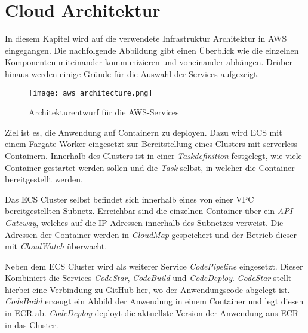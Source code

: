 \section{Cloud Architektur}
In diesem Kapitel wird auf die verwendete Infrastruktur Architektur in \ac{AWS} eingegangen. Die nachfolgende Abbildung gibt einen Überblick wie die einzelnen Komponenten miteinander kommunizieren und voneinander abhängen. Drüber hinaus werden einige Gründe für die Auswahl der Services aufgezeigt.

\begin{figure}[H]
    \centering
    \texttt{[image: aws\_architecture.png]}
    \caption{Architekturentwurf für die AWS-Services}
    \label{fig:CloudArchitektur}
\end{figure}

Ziel ist es, die Anwendung auf Containern zu deployen. Dazu wird \ac{ECS} mit einem \gls{Fargate}-Worker eingesetzt zur Bereitstellung eines Clusters mit serverless Containern. Innerhalb des Clusters ist in einer \textit{Taskdefinition} festgelegt, wie viele Container gestartet werden sollen und die \textit{Task} selbst, in welcher die Container bereitgestellt werden.

Das \ac{ECS} Cluster selbst befindet sich innerhalb eines von einer \ac{VPC} bereitgestellten Subnetz. Erreichbar sind die einzelnen Container über ein \textit{\ac{API} Gateway}, welches auf die IP-Adressen innerhalb des Subnetzes verweist. Die Adressen der Container werden in \textit{CloudMap} gespeichert und der Betrieb dieser mit \textit{CloudWatch} überwacht.

Neben dem \ac{ECS} Cluster wird als weiterer Service \textit{\gls{CodePipeline}} eingesetzt. Dieser Kombiniert die Services \textit{CodeStar}, \textit{CodeBuild} und \textit{CodeDeploy}. \textit{CodeStar} stellt hierbei eine Verbindung zu \gls{GitHub} her, wo der Anwendungscode abgelegt ist. \textit{CodeBuild} erzeugt ein Abbild der Anwendung in einem Container und legt diesen in \ac{ECR} ab. \textit{CodeDeploy} deployt die aktuellste Version der Anwendung aus \ac{ECR} in das Cluster.